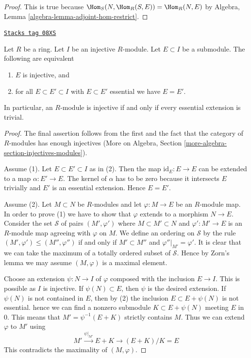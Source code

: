 \begin{proof}
This is true because $\Hom_S(N, \Hom_R(S, E)) = \Hom_R(N, E)$ by
Algebra, Lemma \ref{algebra-lemma-adjoint-hom-restrict}.
\end{proof}

\begin{lemma}
\label{dualizing-lemma-essential-extensions-in-injective}
\href{https://stacks.math.columbia.edu/tag/08XS}{\texttt{Stacks tag 08XS}}

Let $R$ be a ring. Let $I$ be an injective $R$-module. Let $E \subset I$
be a submodule. The following are equivalent
\begin{enumerate}
\item $E$ is injective, and
\item for all $E \subset E' \subset I$ with $E \subset E'$ essential
we have $E = E'$.
\end{enumerate}
In particular, an $R$-module is injective if and only if every essential
extension is trivial.
\end{lemma}

\begin{proof}
The final assertion follows from the first and the fact that the
category of $R$-modules has enough injectives
(More on Algebra, Section \ref{more-algebra-section-injectives-modules}).

\medskip\noindent
Assume (1). Let $E \subset E' \subset I$ as in (2).
Then the map $\text{id}_E : E \to E$ can be extended
to a map $\alpha : E' \to E$. The kernel of $\alpha$ has to be
zero because it intersects $E$ trivially and $E'$ is an essential
extension. Hence $E = E'$.

\medskip\noindent
Assume (2). Let $M \subset N$ be $R$-modules and let $\varphi : M \to E$
be an $R$-module map. In order to prove (1) we have to show that
$\varphi$ extends to a morphism $N \to E$. Consider the set $\mathcal{S}$
of pairs
$(M', \varphi')$ where $M \subset M' \subset N$ and $\varphi' : M' \to E$
is an $R$-module map agreeing with $\varphi$ on $M$. We define an ordering
on $\mathcal{S}$ by the rule $(M', \varphi') \leq (M'', \varphi'')$
if and only if $M' \subset M''$ and $\varphi''|_{M'} = \varphi'$.
It is clear that we can take the maximum of a totally ordered subset
of $\mathcal{S}$. Hence by Zorn's lemma we may assume $(M, \varphi)$
is a maximal element.

\medskip\noindent
Choose an extension $\psi : N \to I$ of $\varphi$ composed
with the inclusion $E \to I$. This is possible as $I$ is injective.
If $\psi(N) \subset E$, then $\psi$ is the desired extension.
If $\psi(N)$ is not contained in $E$, then by (2) the inclusion
$E \subset E + \psi(N)$ is not essential. hence
we can find a nonzero submodule $K \subset E + \psi(N)$ meeting $E$ in $0$.
This means that $M' = \psi^{-1}(E + K)$ strictly contains $M$.
Thus we can extend $\varphi$ to $M'$ using
$$
M' \xrightarrow{\psi|_{M'}} E + K \to (E + K)/K = E
$$
This contradicts the maximality of $(M, \varphi)$.
\end{proof}

